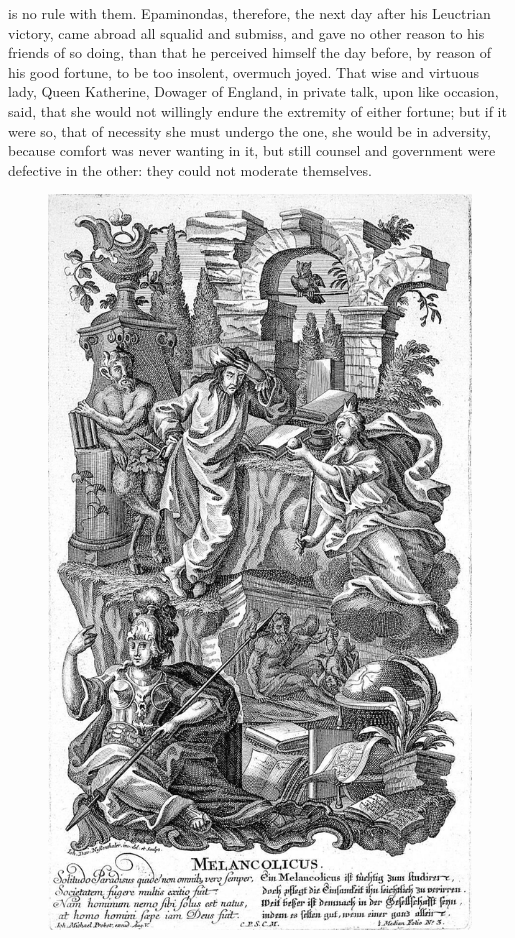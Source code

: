 {is no rule with them. Epaminondas, therefore, the next day after his
Leuctrian victory, came abroad all squalid and submiss, and gave
no other reason to his friends of so doing, than that he perceived
himself the day before, by reason of his good fortune, to be too
insolent, overmuch joyed. That wise and virtuous lady, Queen
Katherine, Dowager of England, in private talk, upon like occasion,
said, that she would not willingly endure the extremity of either
fortune; but if it were so, that of necessity she must undergo the one,
she would be in adversity, because comfort was never wanting in it, but
still counsel and government were defective in the other: they could
not moderate themselves.

\begin{figure}[p]
  \begingroup
  \centering
  \includegraphics[keepaspectratio,width=\textwidth]{figures/scholar-small.jpg}
  \label{fig:scholar}
\end{figure}

}

